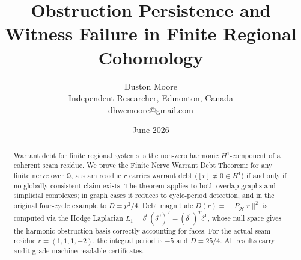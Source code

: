 \documentclass[11pt]{article}
\title{Obstruction Persistence and Witness Failure in Finite Regional Cohomology}
\author{Duston Moore\\Independent Researcher, Edmonton, Canada\\dhwcmoore@gmail.com}
\date{June 2026}
\begin{document}
\maketitle

\begin{abstract}
Warrant debt for finite regional systems is the non-zero harmonic $H^1$-component
of a coherent seam residue. We prove the Finite Nerve Warrant Debt Theorem: for
any finite nerve over $\mathbb{Q}$, a seam residue $r$ carries warrant debt
($[r]\neq0\in H^1$) if and only if no globally consistent claim exists. The
theorem applies to both overlap graphs and simplicial complexes; in graph cases
it reduces to cycle-period detection, and in the original four-cycle example
to $D=p^2/4$. Debt magnitude $D(r)=\|P_{\mathcal{H}^1}r\|^2$ is computed via
the Hodge Laplacian $L_1=\delta^0(\delta^0)^T+(\delta^1)^T\delta^1$, whose
null space gives the harmonic obstruction basis correctly accounting for faces.
For the actual seam residue $r=(1,1,1,-2)$, the integral period is $-5$ and
$D=25/4$. All results carry audit-grade machine-readable certificates.
\end{abstract}
\end{document}
